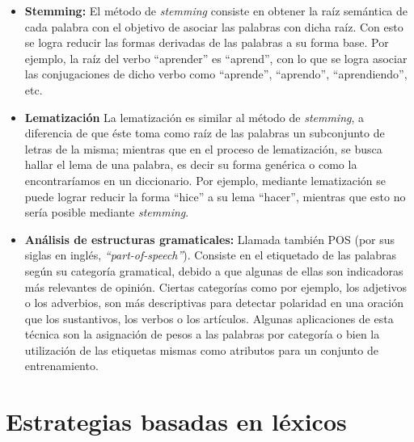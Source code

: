 \begin{itemize}
\item \textbf{Stemming:} El m\'etodo de \textit{stemming} consiste en obtener la ra\'iz sem\'antica de cada palabra con el objetivo de asociar las palabras con dicha ra\'iz. Con esto se logra reducir las formas derivadas de las palabras a su forma base. Por ejemplo, la ra\'iz del verbo ``aprender'' es ``aprend'', con lo que se logra asociar las conjugaciones de dicho verbo como ``aprende'', ``aprendo'', ``aprendiendo'', etc.

\item \textbf{Lematizaci\'on} La lematizaci\'on es similar al m\'etodo de \textit{stemming}, a diferencia de que \'este toma como ra\'iz de las palabras un subconjunto de letras de la misma; mientras que en el proceso de lematizaci\'on, se busca hallar el lema de una palabra, es decir su forma gen\'erica o como la encontrar\'iamos en un diccionario. Por ejemplo, mediante lematizaci\'on se puede lograr reducir la forma ``hice'' a su lema ``hacer'', mientras que esto no ser\'ia posible mediante \textit{stemming}.

\item \textbf{An\'alisis de estructuras gramaticales:} Llamada tambi\'en POS (por sus siglas en ingl\'es, \textit{``part-of-speech''}). Consiste en el etiquetado de las palabras seg\'un su categor\'ia gramatical, debido a que algunas de ellas son indicadoras m\'as relevantes de opini\'on. Ciertas categor\'ias como por ejemplo, los adjetivos o los adverbios, son m\'as descriptivas para detectar polaridad en una oraci\'on que los sustantivos, los verbos o los art\'iculos. Algunas aplicaciones de esta t\'ecnica son la asignaci\'on de pesos a las palabras por categor\'ia o bien la utilizaci\'on de las etiquetas mismas como atributos para un conjunto de entrenamiento.


\end{itemize}



\section{Estrategias basadas en l\'exicos}
